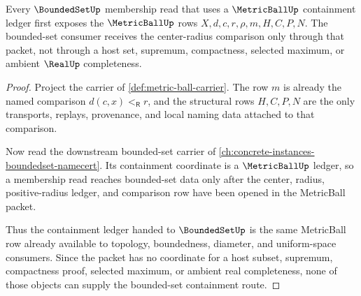 \begin{theorem}
\label{thm:metric-ball-boundedset-containment-route}
Every $\BoundedSetUp$ membership read that uses a $\MetricBallUp$ containment ledger first exposes the $\MetricBallUp$ rows $X,d,c,r,\rho,m,H,C,P,N$. The bounded-set consumer receives the center-radius comparison only through that packet, not through a host set, supremum, compactness, selected maximum, or ambient $\RealUp$ completeness.
\end{theorem}
\begin{proof}
Project the carrier of \autoref{def:metric-ball-carrier}. The row $m$ is already the named comparison $d(c,x)<_{\mathsf R}r$, and the structural rows $H,C,P,N$ are the only transports, replays, provenance, and local naming data attached to that comparison.

Now read the downstream bounded-set carrier of \autoref{ch:concrete-instances-boundedset-namecert}. Its containment coordinate is a $\MetricBallUp$ ledger, so a membership read reaches bounded-set data only after the center, radius, positive-radius ledger, and comparison row have been opened in the MetricBall packet.

Thus the containment ledger handed to $\BoundedSetUp$ is the same MetricBall row already available to topology, boundedness, diameter, and uniform-space consumers. Since the packet has no coordinate for a host subset, supremum, compactness proof, selected maximum, or ambient real completeness, none of those objects can supply the bounded-set containment route.
\end{proof}

